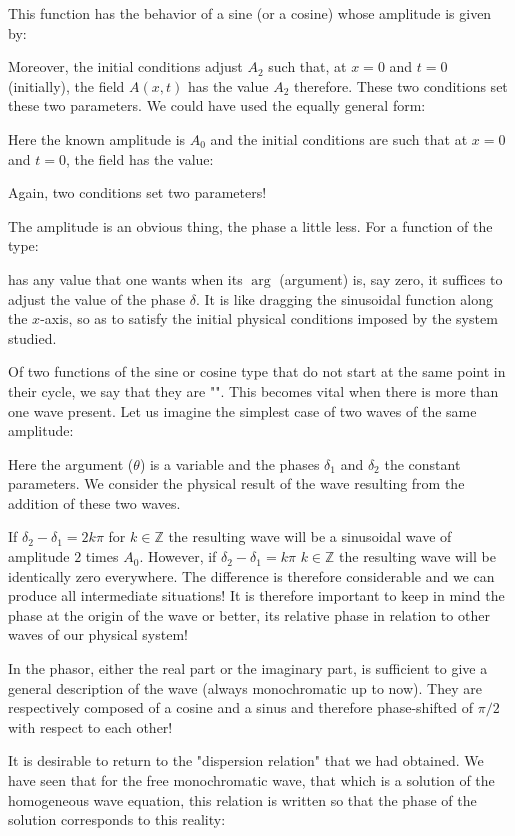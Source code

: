 	This function has the behavior of a sine (or a cosine) whose amplitude is given by:
	
	Moreover, the initial conditions adjust $A_2$ such that, at $x=0$ and $t=0$ (initially), the field $A(x,t)$ has the  value $A_2$ therefore. These two conditions set these two parameters. We could have used the equally general form:
	
	Here the known amplitude is $A_0$ and the initial conditions are such that at $x=0$ and $t=0$, the field has the value:
	
	Again, two conditions set two parameters!
	
	The amplitude is an obvious thing, the phase a little less. For a function of the type:
	
	has any value that one wants when its $\arg$ (argument) is, say zero, it suffices to adjust the value of the phase $\delta$. It is like dragging the sinusoidal function along the $x$-axis, so as to satisfy the initial physical conditions imposed by the system studied.
	
	Of two functions of the sine or cosine type that do not start at the same point in their cycle, we say that they are "". This becomes vital when there is more than one wave present. Let us imagine the simplest case of two waves of the same amplitude:
	
	Here the argument ($\theta$) is a variable and the phases $\delta_1$ and $\delta_2$ the constant parameters. We consider the physical result of the wave resulting from the addition of these two waves.
	
	If $\delta_2-\delta_1=2k\pi$ for $k\in\mathbb{Z}$ the resulting wave will be a sinusoidal wave of amplitude $2$ times $A_0$. However, if $\delta_2-\delta_1=k\pi$ $k\in\mathbb{Z}$ the resulting wave will be identically zero everywhere. The difference is therefore considerable and we can produce all intermediate situations! It is therefore important to keep in mind the phase at the origin of the wave or better, its relative phase in relation to other waves of our physical system!
	
	In the phasor, either the real part or the imaginary part, is sufficient to give a general description of the wave (always monochromatic up to now). They are respectively composed of a cosine and a sinus and therefore phase-shifted of $\pi/2$ with respect to each other!

	It is desirable to return to the "dispersion relation" that we had obtained. We have seen that for the free monochromatic wave, that which is a solution of the homogeneous wave equation, this relation is written so that the phase of the solution corresponds to this reality:
	
